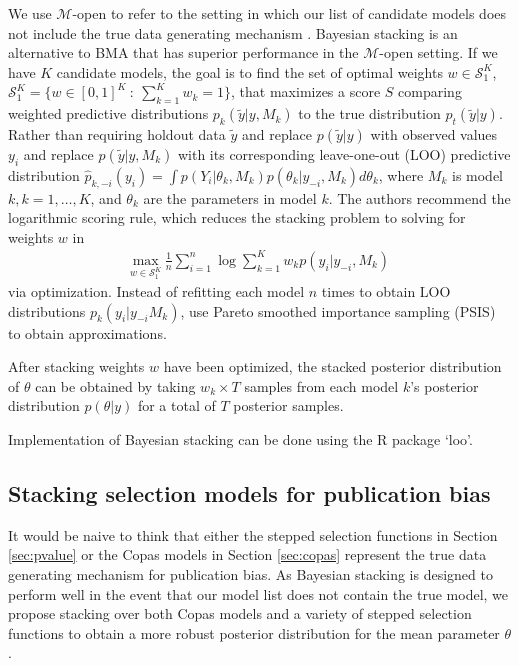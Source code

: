 \documentclass[12pt]{article}   	%
\numberwithin{equation}{section}
\begin{document}
We use $\mathcal{M}$-open to refer to the setting in which our list of candidate models does not include the true data generating mechanism \citep{bernardo2009}. Bayesian stacking \citep{yao2018stacking} is an alternative to BMA that has superior performance in the $\mathcal{M}$-open setting. If we have $K$ candidate models, the goal is to find the set of optimal weights $w \in \mathcal{S}_1^K$, $\mathcal{S}_1^K = \{w \in [0,1]^K \: : \: \sum_{k = 1}^K w_k = 1\}$, that maximizes a score $S$ comparing weighted predictive distributions  $p_k(\tilde{y} \vert y, M_k)$ to the true distribution $p_t(\tilde{y} \vert y)$. Rather than requiring holdout data $\tilde{y}$ and \citet{yao2018stacking} replace $p(\tilde{y} \vert y)$ with observed values $y_i$ and replace $p(\tilde{y} \vert y, M_k)$ with its corresponding leave-one-out (LOO) predictive distribution $\hat{p}_{k, -i}(y_i) = \int p(Y_i \vert \theta_k, M_k) p(\theta_k \vert y_{-i}, M_k) d\theta_k$, where $M_k$ is model $k, k = 1, \dots, K$, and $\theta_k$ are the parameters in model $k$. The authors recommend the logarithmic scoring rule, which reduces the stacking problem to solving for weights $w$ in 
\begin{align}
\underset{w \in \mathcal{S}_1^K}{\mbox{max}} \: \frac{1}{n} \sum_{i = 1}^n \log \sum_{k = 1}^K w_k p(y_i \vert y_{-i}, M_k)
\end{align}
via optimization. Instead of refitting each model $n$ times to obtain LOO distributions ${p}_{k}(y_i \vert y_{-i} M_k)$, \citet{yao2018stacking} use Pareto smoothed importance sampling (PSIS) \citep{vehtari2017psis} to obtain approximations. 

After stacking weights $w$ have been optimized, the stacked posterior distribution of $\theta$ can be obtained by taking $w_k \times T$ samples from each model $k$'s posterior distribution $p(\theta \vert y)$ for a total of $T$ posterior samples. 


Implementation of Bayesian stacking can be done using the R package `loo'. 


\subsection{Stacking selection models for publication bias} \label{sec:stacked_models}

It would be naive to think that either the stepped selection functions in Section \ref{sec:pvalue} or the Copas models in Section \ref{sec:copas} represent the true data generating mechanism for publication bias. As Bayesian stacking is designed to perform well in the event that our model list does not contain the true model, we propose stacking over both Copas models  \citep{mavridis2013copas, bai2020} and a variety of stepped selection functions to obtain a more robust posterior distribution for the mean parameter $\theta$. 
\end{document}
